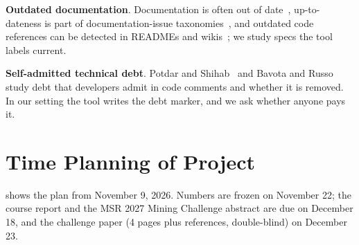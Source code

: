 \documentclass[10pt, conference]{IEEEtran}
\renewcommand{\paragraph}[1]{\noindent\textbf{#1}.}
\begin{document}
\paragraph{Outdated documentation} Documentation is often out of
date~\cite{lethbridge2003}, up-to-dateness is part of documentation-issue
taxonomies~\cite{aghajani2019}, and outdated code references can be detected in READMEs
and wikis~\cite{tan2024}; we study specs the tool labels current.

\paragraph{Self-admitted technical debt} Potdar and Shihab~\cite{potdar2014} and Bavota and
Russo~\cite{bavota2016} study debt that developers admit in code comments and whether it is
removed. In our setting the tool writes the debt marker, and we ask whether anyone pays it.

\section{Time Planning of Project}
\label{sec:schedule}
 shows the plan from November 9, 2026. Numbers are frozen on November 22;
the course report and the MSR 2027 Mining Challenge abstract are due on December 18, and the
challenge paper (4 pages plus references, double-blind) on December 23.


\balance


\end{document}
